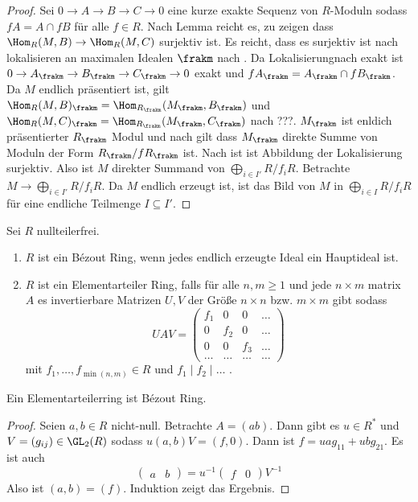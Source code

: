 \begin{proof}
	Sei \(0\to A\to B\to C\to 0\) eine kurze exakte Sequenz von \(R\)-Moduln sodass \(fA=A\cap fB\) für alle \(f\in R\). Nach Lemma  reicht es, zu zeigen dass \(\Hom_R(M,B)\to \Hom_R(M,C)\) surjektiv ist. Es reicht, dass es surjektiv ist nach lokalisieren an maximalen Idealen \(\frakm\) nach . Da Lokalisierungnach  exakt ist \(0\to A_\frakm\to B_\frakm\to C_\frakm\to 0\) exakt und \(fA_\frakm=A_\frakm\cap fB_\frakm\).
	Da \(M\) endlich präsentiert ist, gilt \(\Hom_R(M,B)_\frakm=\Hom_{R_\frakm}(M_\frakm,B_\frakm)\) und \(\Hom_R(M,C)_\frakm=\Hom_{R_\frakm}(M_\frakm,C_\frakm)\) nach ???. \(M_\frakm\) ist enldich präsentierter \(R_\frakm\) Modul und nach  gilt dass \(M_\frakm\) direkte Summe von Moduln der Form \(R_\frakm/fR_\frakm\) ist. Nach  ist ist Abbildung der Lokalisierung surjektiv. Also ist \(M\) direkter Summand von \(\bigoplus_{i\in I'}R/f_iR\). Betrachte \(M\to\bigoplus_{i\in I'}R/f_iR\). Da \(M\) endlich erzeugt ist, ist das Bild von \(M\) in \(\bigoplus_{i\in I}R/f_iR\) für eine endliche Teilmenge \(I\subseteq I'\).
\end{proof}
\begin{Def}
	Sei \(R\) nullteilerfrei.
	\begin{enumerate}
		\item \(R\) ist ein Bézout Ring, wenn jedes endlich erzeugte Ideal ein Hauptideal ist.
		\item \(R\) ist ein Elementarteiler Ring, falls für alle \(n,m\geq 1\) und jede
		\(n\times m\) matrix \(A\) es invertierbare Matrizen \(U,V\) der Größe
		\(n\times n\) bzw. \(m\times m\) gibt sodass \[UAV=\begin{pmatrix}
			f_1 & 0& 0& \dots\\ 0& f_2 & 0& \dots \\ 0&0 & f_3& \dots\\ \dots & \dots & \dots & \dots
		\end{pmatrix}\] mit \(f_1,\dots,f_{\min(n,m)}\in R\) und
		\(f_1\mid f_2\mid\dots\) .
	\end{enumerate}
\end{Def}
\begin{Lemma}
	Ein Elementarteilerring ist Bézout Ring.
\end{Lemma}
\begin{proof}
	Seien \(a,b\in R\) nicht-null. Betrachte \(A=(a b)\). Dann gibt es \(u\in R^*\) und \(V=(g_{ij})\in \GL_2(R)\) sodass \(u(a,b)V=(f,0)\).
	Dann ist \(f=uag_{11}+ubg_{21}\). Es ist auch \[\begin{pmatrix}
		a & b    \end{pmatrix}=u^{-1}\begin{pmatrix}
		f & 0
	\end{pmatrix} V^{-1}
	\] Also ist \((a,b)=(f)\). Induktion zeigt das Ergebnis.
	
\end{proof}
